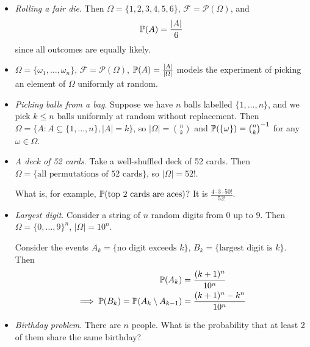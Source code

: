 \documentclass{../../template/note}
\begin{document}
    \begin{example}
        \begin{itemize}
            \item \emph{Rolling a fair die}. Then \(\Omega = \{1, 2, 3, 4, 5, 6\}\), \(\mathcal F = \mathcal P(\Omega)\), and
            \begin{align*}
                \mathbb P(A) = \frac{| A| }{6}
            \end{align*}
            since all outcomes are equally likely.
    
            \item \(\Omega = \{\omega_1, \dots, \omega_n\}\), \(\mathcal F = \mathcal P(\Omega)\), \(\mathbb P(A) = \frac{| A| }{| \Omega| }\) models the experiment of picking an element of \(\Omega\) uniformly at random.
            
            \item \emph{Picking balls from a bag}. Suppose we have \(n\) balls labelled \(\{1, \dots, n\}\), and we pick \(k \leq n\) balls uniformly at random without replacement. Then \(\Omega = \{A:  A \subseteq \{1, \dots, n\}, | A|  = k\}\), so \(| \Omega|  = \binom n k\) and \(\mathbb P(\{\omega\}) = \binom n k ^{-1}\) for any \(\omega \in \Omega\).
            
            \item \emph{A deck of 52 cards}. Take a well-shuffled deck of 52 cards. Then \(\Omega = \{\text{all permutations of 52 cards}\}\), so \(| \Omega|  = 52!\).
            
            What is, for example, \(\mathbb P(\text{top 2 cards are aces})\)? It is \(\frac{4 \cdot 3 \cdot 50!}{52!}\).

            \item \emph{Largest digit}. Consider a string of \(n\) random digits from 0 up to 9. Then \(\Omega = \{0, \dots, 9\}^n\), \(| \Omega|  = 10^n\).
            
            Consider the events \(A_k = \{\text{no digit exceeds } k\}\), \(B_k = \{\text{largest digit is } k\}\). Then
            \begin{align*}
                \mathbb P(A_k) &= \frac{(k+1)^n}{10^n} \\
                \implies \mathbb P(B_k) = \mathbb P(A_k \setminus A_{k-1}) &= \frac{(k+1)^n-k^n}{10^n}
            \end{align*}

            \item \emph{Birthday problem}. There are \(n\) people. What is the probability that at least 2 of them share the same birthday?
            

\end{itemize}
\end{example}
\end{document}
